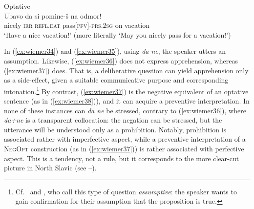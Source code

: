 \documentclass[output=paper,colorlinks,citecolor=brown]{langscibook}
\begin{document}
\ex \label{ex:wiemer38} \textnormal{Optative} \\
\gll Ubavo da si pomine-š na odmor! \\
nicely \textsc{irr} \textsc{refl.dat} pass\textsc{[pfv]-prs.2sg} on vacation \\
\glt `Have a nice vacation!' (more literally `May you nicely pass for a vacation!')
\z
\z


\noindent In (\ref{ex:wiemer34}) and (\ref{ex:wiemer35}), using \textit{da ne}, the speaker utters an assumption. Likewise, (\ref{ex:wiemer36}) does not express apprehension, whereas (\ref{ex:wiemer37}) does. That is, a deliberative question can yield apprehension only as a side-effect, given a suitable communicative purpose and corresponding intonation.\footnote{Cf.\ \citet{Bužarovska2017} and \citet[68--69]{MitkovskaEtAl2017}, who call this type of question \textit{assumptive}: the speaker wants to gain confirmation for their assumption that the proposition is true.} By contrast, (\ref{ex:wiemer37}) is the negative equivalent of an optative sentence (as in (\ref{ex:wiemer38})), and it can acquire a preventive interpretation. In none of these instances can \textit{da ne} be stressed, contrary to (\ref{ex:wiemer36}), where \textit{da+ne} is a transparent collocation: the negation can be stressed, but the utterance will be understood only as a prohibition. Notably, prohibition is associated rather with imperfective aspect, while a preventive interpretation of a \textsc{NegOpt} construction (as in (\ref{ex:wiemer37})) is rather associated with perfective aspect. This is a tendency, not a rule, but it corresponds to the more clear-cut picture in North Slavic (see --).
\end{document}
